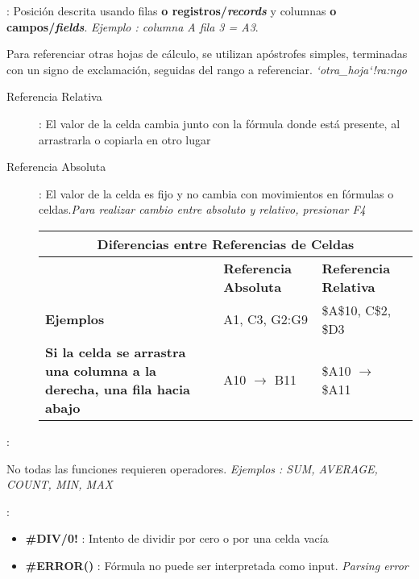 \begin{description}
    \item[Celda]{ : Posición descrita usando filas \textbf{o registros/\textit{records}} y columnas \textbf{o campos/\textit{fields}}. \textit{Ejemplo : columna A fila 3 = A3}. 
    \item {Para referenciar otras hojas de cálculo, se utilizan apóstrofes simples, terminadas con un signo de exclamación, seguidas del rango a referenciar. \textit{`otra\_hoja`!ra:ngo}}
    \begin{description}
        \item[Referencia Relativa]{ : El valor de la celda cambia junto con la fórmula donde está presente, al arrastrarla o copiarla en otro lugar}
        \item[Referencia Absoluta]{ : El valor de la celda es fijo y no cambia con movimientos en fórmulas o celdas.\textit{Para realizar cambio entre absoluto y relativo, presionar F4}}
        \begin{table}
            \centering
            \begin{tabular}{|p{5cm}|p{4.5cm}|p{4.5cm}|}
                \hline
                \multicolumn{3}{|c|}{Diferencias entre Referencias de Celdas} \\
                \hline
                & \textbf{Referencia Absoluta} & \textbf{Referencia Relativa} \\
                \hline
                \textbf{Ejemplos} & A1, C3, G2:G9 & \$A\$10, C\$2, \$D3 \\
                \hline
                \textbf{Si la celda se arrastra una columna a la derecha, una fila hacia abajo} & A10 $\rightarrow$ B11 & \$A10 $\rightarrow$ \$A11 \\
                \hline
            \end{tabular}
        \end{table}
    \end{description}}
    \item[Fórmulas y Funciones]{ : 
    \begin{description}
        \item {No todas las funciones requieren operadores. \textit{Ejemplos : SUM, AVERAGE, COUNT, MIN, MAX}}
        \item[Errores Comunes]{ : 
        \begin{itemize}
            \item {\textbf{\#DIV/0!} : Intento de dividir por cero o por una celda vacía}
            \item {\textbf{\#ERROR()} : Fórmula no puede ser interpretada como input. \textit{Parsing error}}

\end{itemize}}
\end{description}}
\end{description}
